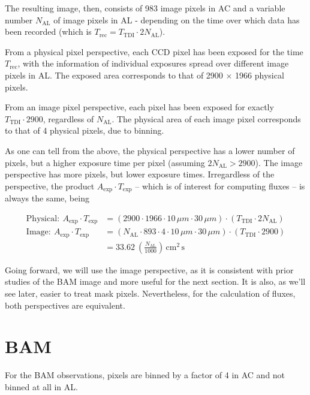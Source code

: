 \documentclass[12pt]{article}
\begin{document}
The resulting image, then, consists of 983 image pixels in AC and a variable number $N_\mathrm{AL}$ of image pixels in AL - depending on the time over which data has been recorded (which is $T_\mathrm{rec} = T_\mathrm{TDI} \cdot 2 N_\mathrm{AL}$).

From a physical pixel perspective, each CCD pixel has been exposed for the time $T_\mathrm{rec}$, with the information of individual exposures spread over different image pixels in AL. The exposed area corresponds to that of 2900 $\times$ 1966 physical pixels.

From an image pixel perspective, each pixel has been exposed for exactly $T_\mathrm{TDI} \cdot 2900$, regardless of $N_\mathrm{AL}$. The physical area of each image pixel corresponds to that of 4 physical pixels, due to binning.

As one can tell from the above, the physical perspective has a lower number of pixels, but a higher exposure time per pixel (assuming $2 N_\mathrm{AL} > 2900$). The image perspective has more pixels, but lower exposure times. Irregardless of the perspective, the product $A_\mathrm{exp} \cdot T_\mathrm{exp}$ -- which is of interest for computing fluxes -- is always the same, being

\begin{align}
  \mathrm{Physical: }~ A_\mathrm{exp} \cdot T_\mathrm{exp} &= \left(2900 \cdot 1966 \cdot 10\,\mu m \cdot 30\,\mu m\right) \cdot \left( T_\mathrm{TDI} \cdot 2 N_\mathrm{AL} \right)\\
  \mathrm{Image: }~ A_\mathrm{exp} \cdot T_\mathrm{exp} &= \left(N_\mathrm{AL} \cdot 893 \cdot 4 \cdot 10\,\mu m \cdot 30\,\mu m\right) \cdot \left( T_\mathrm{TDI} \cdot 2900 \right)\\
  &= 33.62 ~ \left(\frac{N_\mathrm{AL}}{1000}\right)\,\mathrm{cm^{2}\,s}
\end{align}

Going forward, we will use the image perspective, as it is consistent with prior studies of the BAM image and more useful for the next section. It is also, as we'll see later, easier to treat mask pixels. Nevertheless, for the calculation of fluxes, both perspectives are equivalent.

\section{BAM}

For the BAM observations, pixels are binned by a factor of 4 in AC and not binned at all in AL.
\end{document}
